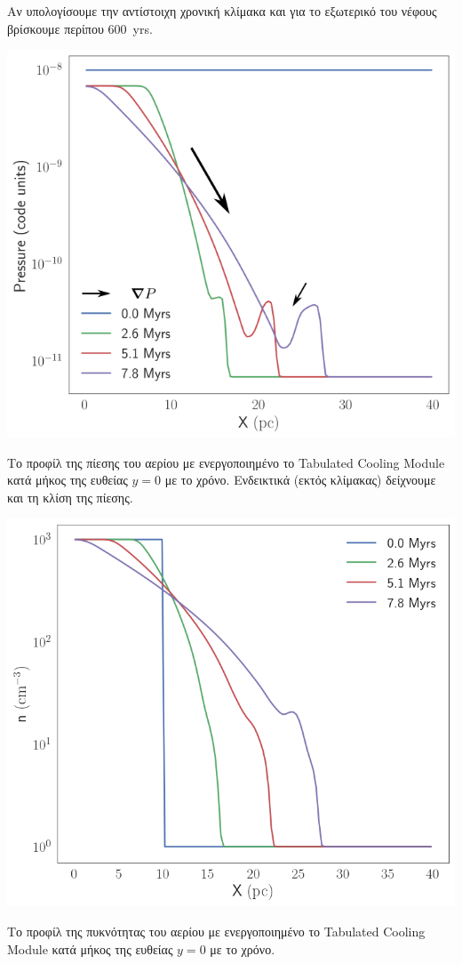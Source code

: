 	Αν υπολογίσουμε την αντίστοιχη χρονική κλίμακα και για το εξωτερικό του νέφους βρίσκουμε περίπου \SI{600}{yrs}. 

	\begin{marginfigure}
	\includegraphics[width=1\linewidth]{DataImages/TabCoolingPRSprofile-gradP}
	\caption{Το προφίλ της πίεσης του αερίου με ενεργοποιημένο το Tabulated Cooling Module κατά μήκος της ευθείας $y=0$ με το χρόνο. Ενδεικτικά (εκτός κλίμακας) δείχνουμε και τη κλίση της πίεσης.}
	\label{fig:tabcoolingprsprofile-gradp}
\end{marginfigure}

\begin{marginfigure}
	\includegraphics[width=1\linewidth]{DataImages/TabCoolingRHOprofile}
	\caption{Το προφίλ της πυκνότητας του αερίου με ενεργοποιημένο το Tabulated Cooling Module κατά μήκος της ευθείας $y=0$ με το χρόνο.} 
	\label{fig:tabcoolingrhoprofile}
\end{marginfigure}	

